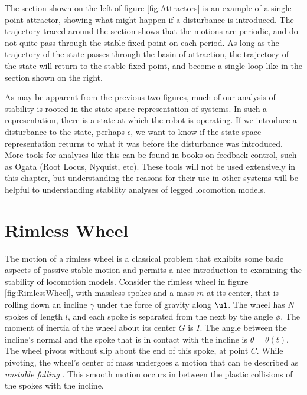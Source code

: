 
The section shown on the left of figure \ref{fig:Attractors} is an example of a
single point attractor, showing what might happen if a disturbance is
introduced. The trajectory traced around the section shows that the motions are
periodic, and do not quite pass through the stable fixed point on each period.
As long as the trajectory of the state passes through the basin of attraction,
the trajectory of the state will return to the stable fixed point, and become a
single loop like in the section shown on the right. 

As may be apparent from the previous two figures, much of our analysis of
stability is rooted in the state-space representation of systems. In such a
representation, there is a state at which the robot is operating. If we
introduce a disturbance to the state, perhaps $\epsilon$, we want to know if
the state space representation returns to what it was before the disturbance
was introduced. More tools for analyses like this can be found in books on
feedback control, such as Ogata \cite{ogata09} (Root Locus, Nyquist, etc).
These tools will not be used extensively in this chapter, but understanding the
reasons for their use in other systems will be helpful to understanding
stability analyses of legged locomotion models. 


\section{Rimless Wheel} %
\label{sec:RimlessWheel}

The motion of a rimless wheel is a classical problem that exhibits some basic
aspects of passive stable motion and permits a nice introduction to examining
the stability of locomotion models. Consider the rimless wheel in figure
\ref{fig:RimlessWheel}, with massless spokes and a mass $m$ at its center, that
is rolling down an incline $\gamma$ under the force of gravity along $\ul$. The
wheel has $N$ spokes of length $l$, and each spoke is separated from the next
by the angle $\phi$. The moment of inertia of the wheel about its center $G$ is
$I$. The angle between the incline's normal and the spoke that is in contact
with the incline is $\theta = \theta(t)$. The wheel pivots without slip about
the end of this spoke, at point $C$. While pivoting, the wheel's center of mass
undergoes a motion that can be described as \textit{unstable falling}
\cite{coleman96, coleman10}. This smooth motion occurs in between the plastic
collisions of the spokes with the incline.

